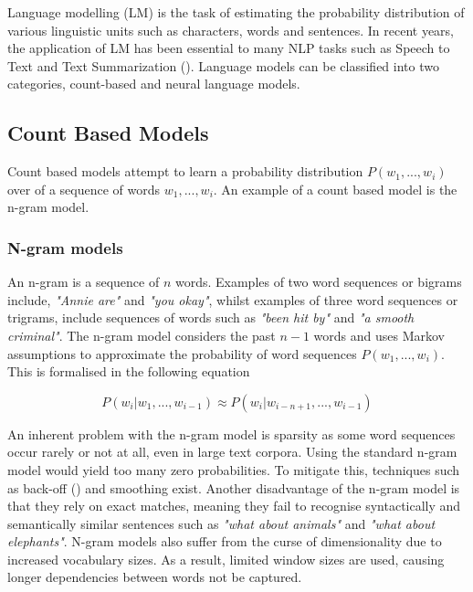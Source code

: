 \noindent
\newline
Language modelling (LM) is the task of estimating the probability distribution of various linguistic units such as characters, words and sentences. In recent years, the application of LM  has been essential to many NLP tasks such as Speech to Text and Text Summarization (\cite{Rush2015}). Language models can be classified into two categories, count-based and neural language models. 

\subsection{Count Based Models}
Count based models attempt to learn a probability distribution \(P(w_{1},...,w_{i}) \) over of a sequence of words \(w_{1},...,w_{i}\). An example of a count based model is the n-gram model.

\subsubsection{N-gram models}
An n-gram is a sequence of \(n\) words. Examples of two word sequences or bigrams include, \textit{"Annie are"} and \textit{"you okay"}, whilst examples of three word sequences or trigrams, include sequences of words such as \textit{"been hit by"} and \textit{"a smooth criminal"}. The n-gram model considers the past \(n-1\) words and uses Markov assumptions to approximate the probability of word sequences \(P(w_{1},...,w_{i}) \). This is formalised in the following equation

\begin{equation}
	P(w_{i} | w_{1},...,w_{i-1}) \approx P(w_{i} | w_{i-n+1},...,w_{i-1})
\end{equation}

\noindent
\newline
An inherent problem with the n-gram model is sparsity as some word sequences occur rarely or not at all, even in large text corpora. Using the standard n-gram model would yield too many zero probabilities. To mitigate this, techniques such as back-off (\cite{Katz1987}) and smoothing exist. Another disadvantage of the n-gram model is that they rely on exact matches, meaning they fail to recognise syntactically and semantically similar sentences such as \textit{"what about animals"} and \textit{"what about elephants"}. N-gram models also suffer from the curse of dimensionality due to increased vocabulary sizes. As a result, limited window sizes are used, causing longer dependencies between words not be captured.

